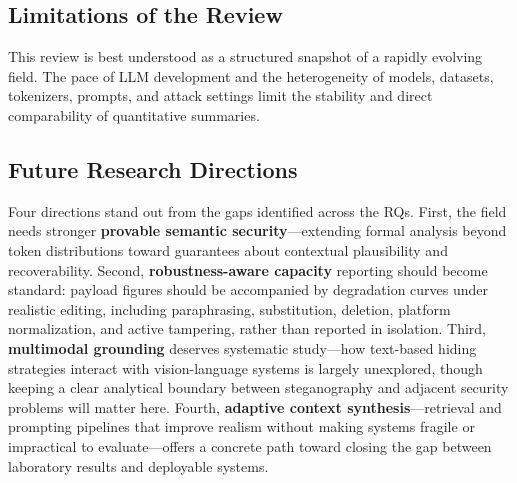 \subsection{Limitations of the Review}

This review is best understood as a structured snapshot of a rapidly evolving field. The pace of LLM development and the heterogeneity of models, datasets, tokenizers, prompts, and attack settings limit the stability and direct comparability of quantitative summaries.

\subsection{Future Research Directions}

Four directions stand out from the gaps identified across the RQs. First, the field needs stronger \textbf{provable semantic security}---extending formal analysis beyond token distributions toward guarantees about contextual plausibility and recoverability. Second, \textbf{robustness-aware capacity} reporting should become standard: payload figures should be accompanied by degradation curves under realistic editing, including paraphrasing, substitution, deletion, platform normalization, and active tampering, rather than reported in isolation. Third, \textbf{multimodal grounding} deserves systematic study---how text-based hiding strategies interact with vision-language systems is largely unexplored, though keeping a clear analytical boundary between steganography and adjacent security problems will matter here. Fourth, \textbf{adaptive context synthesis}---retrieval and prompting pipelines that improve realism without making systems fragile or impractical to evaluate---offers a concrete path toward closing the gap between laboratory results and deployable systems.
